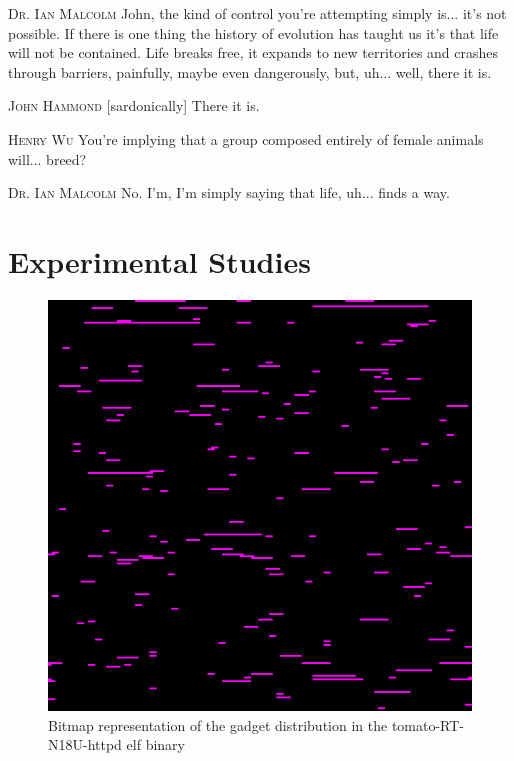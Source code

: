 \documentclass[12pt,glossary]{dalthesis}
\begin{document}
\begin{savequote}
\textsc{Dr. Ian Malcolm} John, the kind of control you're attempting simply is... it's not possible. If there is one thing the history of evolution has taught us it's that life will not be contained. Life breaks free, it expands to new territories and crashes through barriers, painfully, maybe even dangerously, but, uh... well, there it is.

\textsc{John Hammond} [sardonically] There it is.

\textsc{Henry Wu} You're implying that a group composed entirely of female animals will... breed?

\textsc{Dr. Ian Malcolm} No. I'm, I'm simply saying that life, uh... finds a way. 
\end{savequote}

\chapter{Experimental Studies}
\label{sec:org53b1640}
\label{org76ba8e1}

\begin{figure}[htbp]
\centering
\includegraphics[width=.9\linewidth]{../images/tomato-RT-N18U-httpd_heatmap.png}
\caption{\label{fig:org9741c69}
Bitmap representation of the gadget distribution in the tomato-RT-N18U-httpd \gls{elf} binary}
\end{figure}
\end{document}
